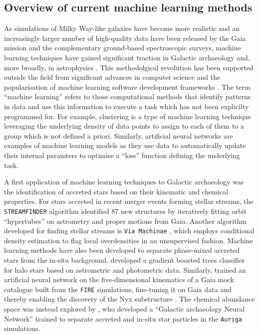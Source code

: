 \subsection{Overview of current machine learning methods}

As simulations of Milky Way-like galaxies have become more realistic and an increasingly larger
number of high-quality data have been released by the Gaia mission and the complementary ground-based
spectroscopic surveys, machine learning techniques have gained significant traction in Galactic
archaeology and, more broadly, in astrophysics \citep{Fluke2020,Ting2025}. 
This methodolgical revolution has been supported outside the field from significant
advances in computer science \citep[see review of][]{LeCun2015} and the 
popularisation of machine learning software development frameworks \citep{Pedregosa2011,Abadi2016,Paszke2019}.
The term ``machine learning'' refers to those computational methods that identify patterns in data
and use this information to execute a task which has not been explicilty programmed for. For example, 
clustering is a type of machine learning technique leveraging the underlying density of data
points to assign to each of them to a group which is not defined a priori. Similarly, artificial neural 
networks are examples of machine learning models as they use data to automatically update their internal paramters to
optimise a ``loss'' function defining the underlying task.

A first application of machine learning techniques to Galactic archaeology was the identification of accreted
stars based on their kinematic and chemical properties. For stars accreted in
recent merger events forming stellar streams, the \texttt{STREAMFINDER} algorithm \citep{Malhan2018} 
identified 87 new structures \citep{Ibata2024} by iteratively fitting orbit ``hypertubes'' on 
astrometry and proper motions from Gaia. Another algorithm developed for finding
stellar streams is \texttt{Via~Machinae} \citep{Shih2022}, which
employs conditional density estimation to flag local overdensities in an unsupervised fashion.
Machine learning methods have also been developed to separate phase-mixed accreted stars from the
in-situ background.\citet{Veljanoski2019} developed a gradient boosted trees classifier 
for halo stars based on astrometric and photometric data. Similarly, \citet{Ostdiek2020} trained an artificial neural network on 
the five-dimensional kinematics of a Gaia mock catalogue built 
from the \texttt{FIRE} simulations, fine-tuning it on Gaia data 
and thereby enabling the discovery of the Nyx substructure \citep{Necib2020a}. The chemical
abundance space was instead explored by \citet{Tronrud2022}, who developed a ``Galactic archaeology Neural Network'' 
trained to separate accreted and in-situ star particles in the \texttt{Auriga} simulations.

